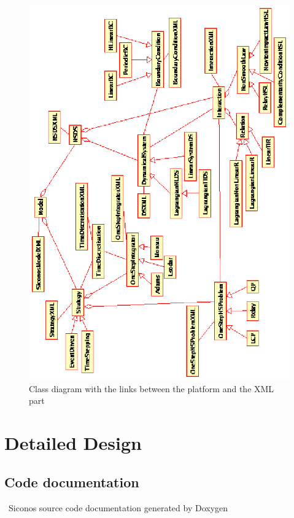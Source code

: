 	\begin{figure}
	\begin{center}
	\includegraphics[scale=1.6, clip]{figure/platform.eps}
	\caption{Class diagram with the links between the platform and the XML part}
	\label{fig: Class diagram with the links between the platform and the XML part}
	\end{center}
	\end{figure}


\section{Detailed Design}
\subsection{Code documentation}
\cf~Siconos source code documentation generated by Doxygen


